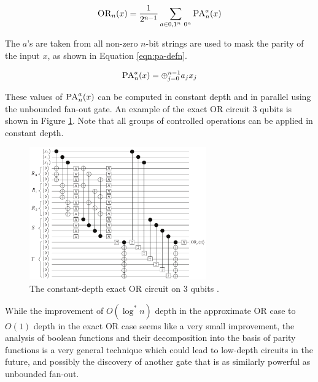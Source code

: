 \begin{equation}
\textsc{OR}_n(x) = \frac{1}{2^{n-1}} \sum_{a\in {0,1}^n\ {0^n}} \textsc{PA}_n^a(x)
\label{eqn:pa-decomp}
\end{equation}

The $a$'s are taken from all non-zero $n$-bit strings are used to mask
the parity of the input $x$, as shown in Equation \ref{eqn:pa-defn}.

\begin{equation}
\textsc{PA}_n^a(x) = \oplus_{j=0}^{n-1} a_j x_j
\label{eqn:pa-defn}
\end{equation}

These values of $\textsc{PA}_n^a(x)$ can be computed in constant depth and
in parallel using
the unbounded fan-out gate. An example of the exact \textsc{OR} circuit 3 qubits is
shown in Figure
\ref{fig:or3}. Note that all groups of controlled operations can be applied
in constant depth.

\begin{figure}
\begin{center}
\includegraphics[width=3in]{figures/or3.pdf}
\caption{The constant-depth exact \textsc{OR} circuit on 3 qubits \cite{Takahashi2011}.}
\label{fig:or3}
\end{center}
\end{figure}

While the improvement of $O(\log^*{n})$ depth in the approximate \textsc{OR} case to
$O(1)$ depth in the exact \textsc{OR} case seems like a very small improvement,
the analysis of boolean functions and their decomposition into the
basis of parity functions is a very general technique which could lead to
low-depth circuits in the future, and possibly the discovery of another gate
that is as similarly powerful as unbounded fan-out.